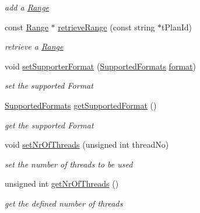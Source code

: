 \begin{DoxyCompactItemize}
\begin{DoxyCompactList}\small\item\em add a \hyperlink{structit_1_1testbench_1_1data_1_1Range}{Range} \end{DoxyCompactList}\item 
const \hyperlink{structit_1_1testbench_1_1data_1_1Range}{Range} $\ast$ \hyperlink{classit_1_1testbench_1_1data_1_1TestBenchConfiguration_a4ac49a696cbd1f42c5ad51883e0cb70f}{retrieve\-Range} (const string $\ast$t\-Plan\-Id)
\begin{DoxyCompactList}\small\item\em retrieve a \hyperlink{structit_1_1testbench_1_1data_1_1Range}{Range} \end{DoxyCompactList}\item 
void \hyperlink{classit_1_1testbench_1_1data_1_1TestBenchConfiguration_a8cf2f6fd0ecaac6e70e0b97d468e6aae}{set\-Supporter\-Format} (\hyperlink{namespaceit_1_1testbench_1_1data_afb7601d9882295fae3688eaee6a418f2}{Supported\-Formats} \hyperlink{classit_1_1testbench_1_1data_1_1TestBenchConfiguration_abaced1b870ac640b02227c6ffcc6ddcd}{format})
\begin{DoxyCompactList}\small\item\em set the supported Format \end{DoxyCompactList}\item 
\hyperlink{namespaceit_1_1testbench_1_1data_afb7601d9882295fae3688eaee6a418f2}{Supported\-Formats} \hyperlink{classit_1_1testbench_1_1data_1_1TestBenchConfiguration_acad3203c220e63a2fbf394781c3abbf3}{get\-Supported\-Format} ()
\begin{DoxyCompactList}\small\item\em get the supported Format \end{DoxyCompactList}\item 
void \hyperlink{classit_1_1testbench_1_1data_1_1TestBenchConfiguration_ae9f200a4cbabc30391d436daaa25d7f3}{set\-Nr\-Of\-Threads} (unsigned int thread\-No)
\begin{DoxyCompactList}\small\item\em set the number of threads to be used \end{DoxyCompactList}\item 
unsigned int \hyperlink{classit_1_1testbench_1_1data_1_1TestBenchConfiguration_a2da1a1a2b83b62d4813920a2df46f270}{get\-Nr\-Of\-Threads} ()
\begin{DoxyCompactList}\small\item\em get the defined number of threads \end{DoxyCompactList}\item 

\end{DoxyCompactItemize}
